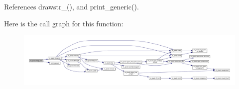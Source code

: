 References drawstr\+\_\+(), and print\+\_\+generic().

Here is the call graph for this function\+:
\nopagebreak
\begin{figure}[H]
\begin{center}
\leavevmode
\includegraphics[width=350pt]{namespacem__pixel_a8c097c521deafffc765bd3f35eca423c_cgraph}
\end{center}
\end{figure}
\mbox{\label{namespacem__pixel_af907f9c8cb0421cf9c5e6356e355382e}} 
